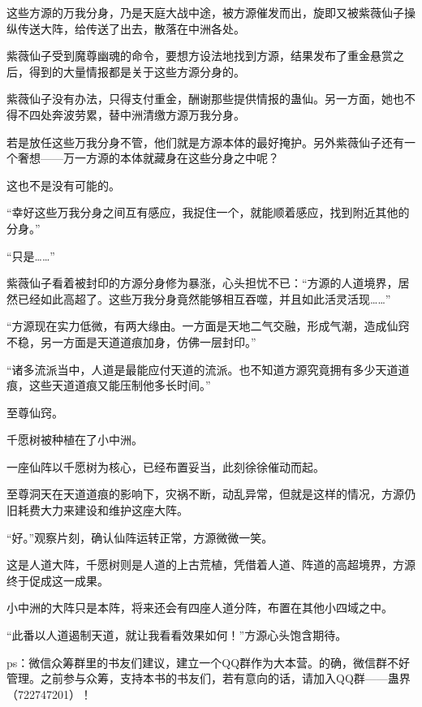 \begin{this_body}
这些方源的万我分身，乃是天庭大战中途，被方源催发而出，旋即又被紫薇仙子操纵传送大阵，给传送了出去，散落在中洲各处。

紫薇仙子受到魔尊幽魂的命令，要想方设法地找到方源，结果发布了重金悬赏之后，得到的大量情报都是关于这些方源分身的。

紫薇仙子没有办法，只得支付重金，酬谢那些提供情报的蛊仙。另一方面，她也不得不四处奔波劳累，替中洲清缴方源万我分身。

若是放任这些万我分身不管，他们就是方源本体的最好掩护。另外紫薇仙子还有一个奢想——万一方源的本体就藏身在这些分身之中呢？

这也不是没有可能的。

“幸好这些万我分身之间互有感应，我捉住一个，就能顺着感应，找到附近其他的分身。”

“只是……”

紫薇仙子看着被封印的方源分身修为暴涨，心头担忧不已：“方源的人道境界，居然已经如此高超了。这些万我分身竟然能够相互吞噬，并且如此活灵活现……”

“方源现在实力低微，有两大缘由。一方面是天地二气交融，形成气潮，造成仙窍不稳，另一方面是天道道痕加身，仿佛一层封印。”

“诸多流派当中，人道是最能应付天道的流派。也不知道方源究竟拥有多少天道道痕，这些天道道痕又能压制他多长时间。”

至尊仙窍。

千愿树被种植在了小中洲。

一座仙阵以千愿树为核心，已经布置妥当，此刻徐徐催动而起。

至尊洞天在天道道痕的影响下，灾祸不断，动乱异常，但就是这样的情况，方源仍旧耗费大力来建设和维护这座大阵。

“好。”观察片刻，确认仙阵运转正常，方源微微一笑。

这是人道大阵，千愿树则是人道的上古荒植，凭借着人道、阵道的高超境界，方源终于促成这一成果。

小中洲的大阵只是本阵，将来还会有四座人道分阵，布置在其他小四域之中。

“此番以人道遏制天道，就让我看看效果如何！”方源心头饱含期待。

ps：微信众筹群里的书友们建议，建立一个QQ群作为大本营。的确，微信群不好管理。之前参与众筹，支持本书的书友们，若有意向的话，请加入QQ群——蛊界（722747201）！

\end{this_body}

